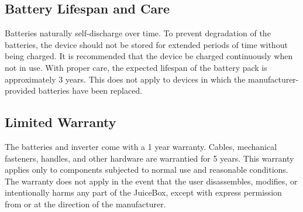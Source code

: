 \documentclass[../jb_user_manual.tex]{subfiles}
\begin{document}
\subsection{\Large{Battery Lifespan and Care}}

Batteries naturally self-discharge over time.  To prevent degradation of the batteries, the device should not be stored for extended periods of time without being charged.  It is recommended that the device be charged continuously when not in use. With proper care, the expected lifespan of the battery pack is approximately 3 years.  This does not apply to devices in which the manufacturer-provided batteries have been replaced.

\subsection{\Large{Limited Warranty}}

The batteries and inverter come with a 1 year warranty.  Cables, mechanical fasteners, handles, and other hardware are warrantied for 5 years.  This warranty applies only to components subjected to normal use and reasonable conditions.  The warranty does not apply in the event that the user disassembles, modifies, or intentionally harms any part of the JuiceBox, except with express permission from or at the direction of the manufacturer.
\end{document}
